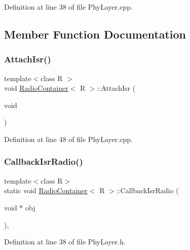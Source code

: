 Definition at line 38 of file Phy\+Layer.\+cpp.



\subsection{Member Function Documentation}
\mbox{\label{class_radio_container_ab4ae2d79a43dca2bdf0900cc2e3aac5c}} 
\subsubsection{\texorpdfstring{Attach\+Isr()}{AttachIsr()}}
{\footnotesize\ttfamily template$<$class R $>$ \\
void \mbox{\hyperlink{class_radio_container}{Radio\+Container}}$<$ R $>$\+::Attach\+Isr (\begin{DoxyParamCaption}\item[{void}]{ }\end{DoxyParamCaption})}



Definition at line 48 of file Phy\+Layer.\+cpp.

\mbox{\label{class_radio_container_afd4dc2a290ab1f6d4cf7920ab457fac7}} 
\subsubsection{\texorpdfstring{Callback\+Isr\+Radio()}{CallbackIsrRadio()}}
{\footnotesize\ttfamily template$<$class R$>$ \\
static void \mbox{\hyperlink{class_radio_container}{Radio\+Container}}$<$ R $>$\+::Callback\+Isr\+Radio (\begin{DoxyParamCaption}\item[{void $\ast$}]{obj }\end{DoxyParamCaption})\hspace{0.3cm}{\ttfamily [inline]}, {\ttfamily [static]}}



Definition at line 38 of file Phy\+Layer.\+h.

\mbox{\label{class_radio_container_a8819af2363c07fc158989c57a45e5e48}} 

